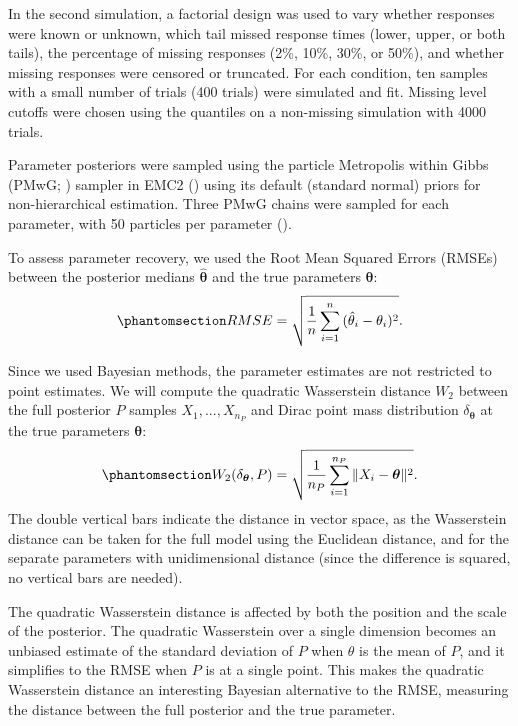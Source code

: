 \documentclass[
  stu,
  longtable,
  nolmodern,
  notxfonts,
  notimes,
  draftfirst,
  colorlinks=true,linkcolor=blue,citecolor=blue,urlcolor=blue]{apa7}
\begin{document}
In the second simulation, a factorial design was used to vary whether
responses were known or unknown, which tail missed response times
(lower, upper, or both tails), the percentage of missing responses (2\%,
10\%, 30\%, or 50\%), and whether missing responses were censored or
truncated. For each condition, ten samples with a small number of trials
(400 trials) were simulated and fit. Missing level cutoffs were chosen
using the quantiles on a non-missing simulation with 4000 trials.

Parameter posteriors were sampled using the particle Metropolis within
Gibbs (PMwG; ) sampler in EMC2
() using its default
(standard normal) priors for non-hierarchical estimation. Three PMwG
chains were sampled for each parameter, with 50 particles per parameter
().

To assess parameter recovery, we used the Root Mean Squared Errors
(RMSEs) between the posterior medians \(\boldsymbol{\hat{\theta}}\) and
the true parameters \(\boldsymbol{\theta}\):
\begin{equation}\phantomsection\label{eq-RMSE}{
RMSE = \sqrt{\frac{1}{n}\sum_{i=1}^{n}{(\hat{\theta}_i - \theta_i)^2}}.
}\end{equation}

Since we used Bayesian methods, the parameter estimates are not
restricted to point estimates. We will compute the quadratic Wasserstein
distance \(W_2\) between the full posterior \(P\) samples
\(X_1,...,X_{n_P}\) and Dirac point mass distribution
\(\delta_{\boldsymbol{\theta}}\) at the true parameters
\(\boldsymbol{\theta}\):
\begin{equation}\phantomsection\label{eq-Wasserstein}{
W_2(\delta_{\boldsymbol{\theta}}, P) = \sqrt{\frac{1}{n_P} \sum_{i=1}^{n_P}{\|X_i - \boldsymbol{\theta}\|^2}}.
}\end{equation} The double vertical bars indicate the distance in vector
space, as the Wasserstein distance can be taken for the full model using
the Euclidean distance, and for the separate parameters with
unidimensional distance (since the difference is squared, no vertical
bars are needed).

The quadratic Wasserstein distance is affected by both the position and
the scale of the posterior. The quadratic Wasserstein over a single
dimension becomes an unbiased estimate of the standard deviation of
\(P\) when \(\theta\) is the mean of \(P\), and it simplifies to the
RMSE when \(P\) is at a single point. This makes the quadratic
Wasserstein distance an interesting Bayesian alternative to the RMSE,
measuring the distance between the full posterior and the true
parameter.
\end{document}
